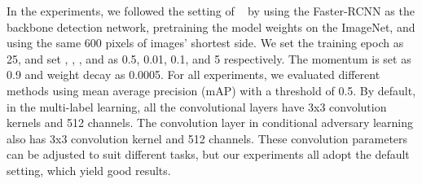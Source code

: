 \documentclass[runningheads]{llncs}
\begin{document}
In the experiments, we followed the setting of ~\cite{saito2019strong} 
by using the Faster-RCNN as the backbone detection network, 
pretraining the model weights on the ImageNet,
and using the same 600 pixels of images' shortest side. 
We set the training epoch as 25, 
and set , , , and   as 0.5, 0.01, 0.1, and 5 respectively. 
The momentum is set as 0.9 and weight decay as 0.0005. 
For all experiments, we evaluated different methods using mean average precision (mAP) with a threshold of 0.5. 
By default, in the multi-label learning, 
all the convolutional layers have 3x3 convolution kernels and 512 channels.
The convolution layer in conditional adversary learning also has 3x3 convolution kernel and 512 channels. 
These convolution parameters can be adjusted to suit different tasks, but our experiments all adopt the default setting,
which yield good results.
\end{document}
